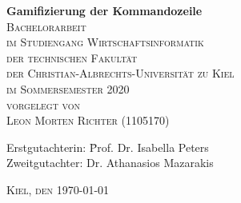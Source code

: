 \begin{titlepage}
\begin{center}


{ \Large \bfseries
Gamifizierung der Kommandozeile
}\\[2.5cm]

\textsc{ Bachelorarbeit}\\[2.0cm]

\textsc{ 
im Studiengang Wirtschaftsinformatik \\
der technischen Fakultät \\
der Christian-Albrechts-Universität zu Kiel \\
im Sommersemester 2020 
}\\[2.5cm]

\textsc{ 
vorgelegt von \\
Leon Morten Richter (1105170)
}\\[2.5cm]

\vfill

\begin{flushleft}
    \begin{tabbing}
        Erstgutachterin: \=  Prof. Dr. Isabella Peters\\
        Zweitgutachter: \> Dr. Athanasios Mazarakis \\[1.25cm]
    \end{tabbing}
\textsc{Kiel, den \today}
\end{flushleft}

\end{center}
\end{titlepage}